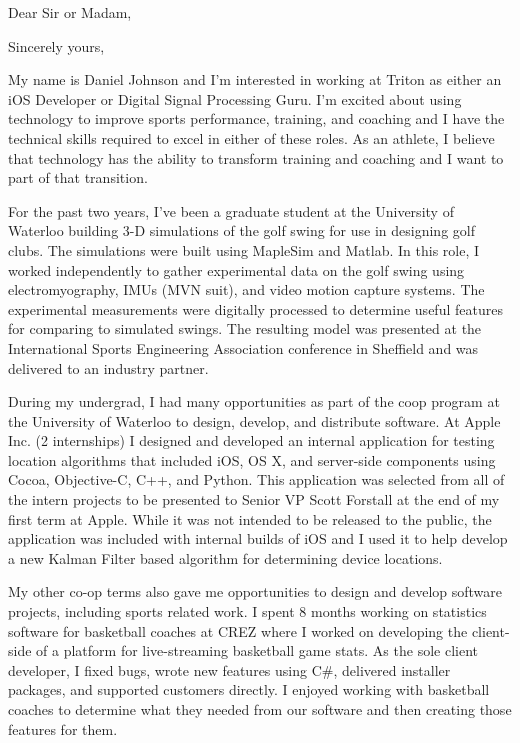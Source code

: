 \documentclass[11pt,a4paper,sans]{moderncv} %
\begin{document}
\clearpage

\date{\today} %
\opening{Dear Sir or Madam,} %
\closing{Sincerely yours,} %

\makelettertitle %

My name is Daniel Johnson and I'm interested in working at Triton as either an iOS Developer or Digital Signal Processing Guru.  I'm excited about using technology to improve sports performance, training, and coaching and I have the technical skills required to excel in either of these roles. As an athlete, I believe that technology has the ability to transform training and coaching and I want to part of that transition.

For the past two years, I've been a graduate student at the University of Waterloo building 3-D simulations of the golf swing for use in designing golf clubs. The simulations were built using MapleSim and Matlab. In this role, I worked independently to gather experimental data on the golf swing using electromyography, IMUs (MVN suit), and video motion capture systems. The experimental measurements were digitally processed to determine useful features for comparing to simulated swings.  The resulting model was presented at the International Sports Engineering Association conference in Sheffield and was delivered to an industry partner.

During my undergrad, I had many opportunities as part of the coop program at the University of Waterloo to design, develop, and distribute software.  At Apple Inc. (2 internships) I designed and developed an internal application for testing location algorithms that included iOS, OS X, and server-side components using Cocoa, Objective-C, C++, and Python.  This application was selected from all of the intern projects to be presented to Senior VP Scott Forstall at the end of my first term at Apple. While it was not intended to be released to the public, the application was included with internal builds of iOS and I used it to help develop a new Kalman Filter based algorithm for determining device locations.

My other co-op terms also gave me opportunities to design and develop software projects, including sports related work.  I spent 8 months working on statistics software for basketball coaches at CREZ where I worked on developing the client-side of a platform for live-streaming basketball game stats. As the sole client developer, I fixed bugs, wrote new features using C\#, delivered installer packages, and supported customers directly. I enjoyed working with basketball coaches to determine what they needed from our software and then creating those features for them.
\end{document}
